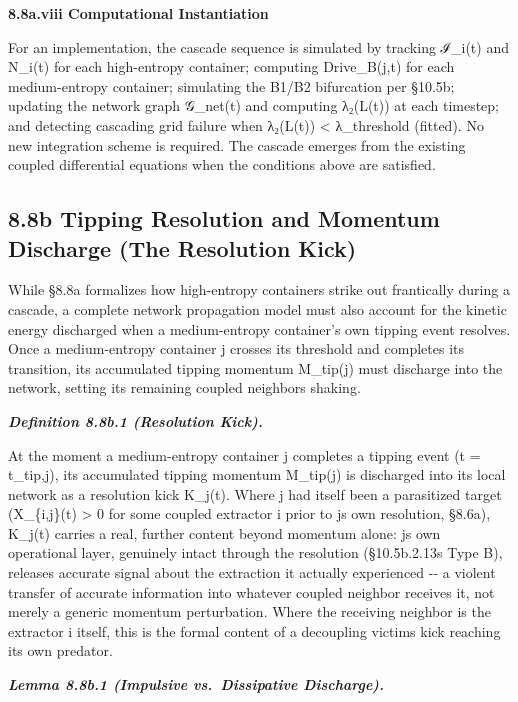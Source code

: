 \documentclass[
]{article}
\begin{document}
\textbf{8.8a.viii Computational Instantiation}

For an implementation, the cascade sequence is simulated by tracking
ℐ\_i(t) and N\_i(t) for each high-entropy container; computing
Drive\_B(j,t) for each medium-entropy container; simulating the B1/B2
bifurcation per §10.5b; updating the network graph 𝒢\_net(t) and
computing λ₂(L(t)) at each timestep; and detecting cascading grid
failure when λ₂(L(t)) \textless{} λ\_threshold (fitted). No new
integration scheme is required. The cascade emerges from the existing
coupled differential equations when the conditions above are satisfied.

\hypertarget{b-tipping-resolution-and-momentum-discharge-the-resolution-kick}{%
\subsection{8.8b Tipping Resolution and Momentum Discharge (The
Resolution
Kick)}\label{b-tipping-resolution-and-momentum-discharge-the-resolution-kick}}

While §8.8a formalizes how high-entropy containers strike out
frantically during a cascade, a complete network propagation model must
also account for the kinetic energy discharged when a medium-entropy
container's own tipping event resolves. Once a medium-entropy container
j crosses its threshold and completes its transition, its accumulated
tipping momentum M\_tip(j) must discharge into the network, setting its
remaining coupled neighbors shaking.

\emph{\textbf{Definition 8.8b.1 (Resolution Kick).}}

At the moment a medium-entropy container j completes a tipping event (t
= t\_tip,j), its accumulated tipping momentum M\_tip(j) is discharged
into its local network as a resolution kick K\_j(t). Where j had itself
been a parasitized target (X\_\{i,j\}(t) \textgreater{} 0 for some
coupled extractor i prior to js own resolution, §8.6a), K\_j(t) carries
a real, further content beyond momentum alone: js own operational layer,
genuinely intact through the resolution (§10.5b.2.13s Type B), releases
accurate signal about the extraction it actually experienced -\/- a
violent transfer of accurate information into whatever coupled neighbor
receives it, not merely a generic momentum perturbation. Where the
receiving neighbor is the extractor i itself, this is the formal content
of a decoupling victims kick reaching its own predator.

\emph{\textbf{Lemma 8.8b.1 (Impulsive vs.~Dissipative Discharge).}}
\end{document}
